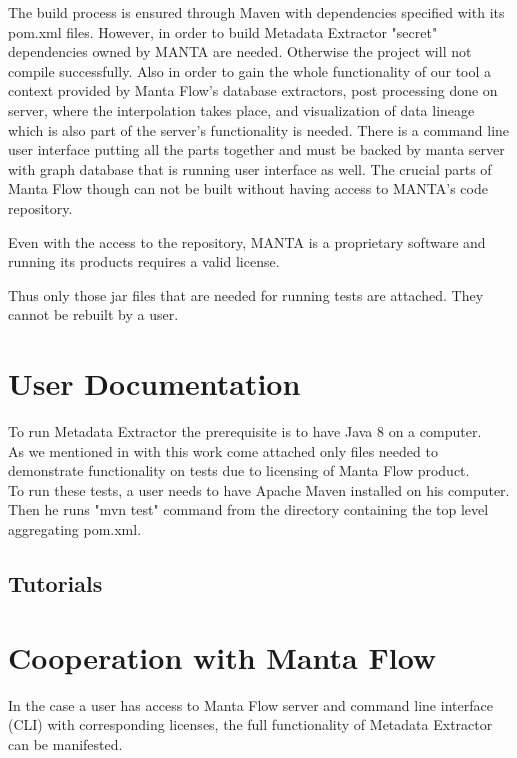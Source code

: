 \documentclass[12pt,a4paper]{report}
\begin{document}
The build process is ensured through Maven with dependencies specified with its pom.xml files.
However, in order to build Metadata Extractor "secret" dependencies owned by MANTA are needed. Otherwise the project will not compile successfully. 
Also in order to gain the whole functionality of our tool a context provided by Manta Flow's database extractors, post processing done on server, where the interpolation takes place, and visualization of data lineage which is also part of the server's functionality is needed. 
There is a command line user interface putting all the parts together and must be backed by manta server with graph database that is running user interface as well. The crucial parts of Manta Flow though can not be built without having access to MANTA's code repository.

Even with the access to the repository, MANTA is a proprietary software and running its products requires a valid license.

Thus only those jar files that are needed for running tests are attached. They cannot be rebuilt by a user.


\section{User Documentation}

To run Metadata Extractor the prerequisite is to have Java 8 on a computer. \\

As we mentioned in  with this work come attached only files needed to demonstrate functionality on tests due to licensing of Manta Flow product.\\ 

To run these tests, a user needs to have Apache Maven installed on his computer. \\ 
Then he runs "mvn test" command from the directory containing the top level aggregating pom.xml.

\subsection{Tutorials}


\section{Cooperation with Manta Flow}

In the case a user has access to Manta Flow server and command line interface (CLI) with corresponding licenses, the full functionality of Metadata Extractor can be manifested.
\end{document}
